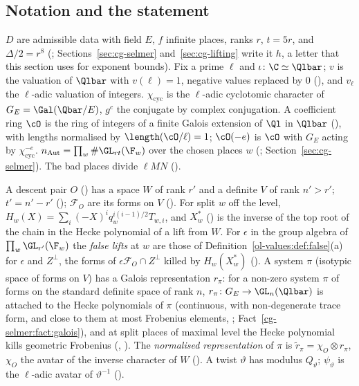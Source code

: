 \subsection{Notation and the statement}\label{cg-first:ss:statement}

$D$ are admissible data with field $E$, $f$ infinite places, ranks $r$, $t=5r$, and $\Delta/2=r^8$
(; Sections~\ref{sec:cg-selmer} and~\ref{sec:cg-lifting} write it $h$, a letter
that this section uses for exponent bounds). Fix a prime $\ell$ and $\iota\colon\C\simeq\Qlbar$; $v$ is the valuation of
$\Qlbar$ with $v(\ell)=1$, negative values replaced by $0$ (), and $v_\ell$ the
$\ell$-adic valuation of integers. $\chi_{\mathrm{cyc}}$ is the $\ell$-adic cyclotomic character of
$G_E=\Gal(\Qbar/E)$, $g^c$ the conjugate by complex conjugation. A coefficient ring $\cO$ is
the ring of integers of a finite Galois extension of $\Ql$ in $\Qlbar$ (), with
lengths normalised by $\length(\cO/\ell)=1$; $\cO(-e)$ is $\cO$ with $G_E$ acting by
$\chi_{\mathrm{cyc}}^{-e}$. $n_{\mathrm{Aut}}=\prod_w\#\GL_{rt}(\F_w)$ over the chosen places $w$
(; Section~\ref{sec:cg-selmer}). The bad places divide $\ell MN$
().

A descent pair $O$ () has a space $W$ of rank $r'$ and a definite $V$ of rank
$n'>r'$; $t'=n'-r'$ (); $\mathcal F_O$ are its forms on $V$
(). For split $w$ off the level, $H_w(X)=\sum_i(-X)^iq_w^{i(i-1)/2}T_{w,i}$,
and $X^*_w$ () is the inverse of the top root of the chain in the
Hecke polynomial of a lift from $W$. For $\epsilon$ in the group algebra of $\prod_w\GL_{r'}(\F_w)$
the \emph{false lifts} at $w$ are those of Definition~\ref{ol-values:def:false}(a) for $\epsilon$ and
$Z^\perp$, the forms of $\epsilon\mathcal F_O\cap Z^\perp$ killed by
$H_w(X^*_w)$ (). A system $\pi$ (isotypic space of forms on $V$) has a
Galois representation $r_\pi$: for a non-zero system $\pi$ of forms on the standard definite space of
rank $n$, $r_\pi\colon G_E\to\GL_n(\Qlbar)$ is attached to the Hecke polynomials of $\pi$ (continuous,
with non-degenerate trace form, and close to them at most Frobenius elements, ;
Fact~\ref{cg-selmer:fact:galois}), and at split places of maximal level the Hecke polynomial kills
geometric Frobenius (, ). The
\emph{normalised representation} of $\pi$ is
$\tilde r_\pi=\chi_O\otimes r_\pi$, $\chi_O$ the avatar of the inverse character of $W$
(). A twist $\vartheta$ has modulus $Q_\vartheta$; $\psi_\vartheta$ is
the $\ell$-adic avatar of $\vartheta^{-1}$ ().

